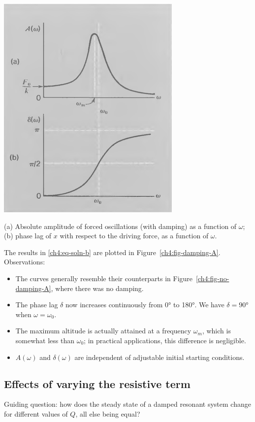 \begin{marginfigure}
	\centering
	\includegraphics[scale=0.5]{phys232/Ch4-forced-damping-A.png} \caption{(a) Absolute amplitude of forced oscillations (with damping) as a function of $\omega$; (b) phase lag of $x$ with respect to the driving force, as a function of $\omega$.}	\label{ch4:fig-damping-A}
\end{marginfigure}

The results in \eqref{ch4:eq-soln-b} are plotted in Figure~\ref{ch4:fig-damping-A}. Observations:
\begin{itemize}
	\item The curves generally resemble their counterparts in Figure~\ref{ch4:fig-no-damping-A}, where there was no damping.
	\item The phase lag $\delta$ now increases continuously from 0° to 180°. We have $\delta=90$° when $\omega=\omega_0$.
	\item The maximum altitude is actually attained at a frequency $\omega_m$, which is somewhat less than $\omega_0$; in practical applications, this difference is negligible.
	\item $A(\omega)$ and $\delta(\omega)$ are independent of adjustable initial starting conditions.
\end{itemize}

\subsection{Effects of varying the resistive term}
Guiding question: how does the steady state of a damped resonant system change for different values of $Q$, all else being equal?

